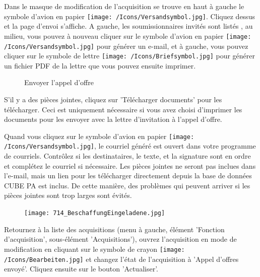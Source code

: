 Dans le masque de modification de l'acquisition se trouve en haut à gauche le symbole d'avion en papier \texttt{[image: /Icons/Versandsymbol.jpg]}. Cliquez dessus et la page d'envoi s'affiche. A gauche, les soumissionnaires invités sont listés , au milieu, vous pouvez à nouveau cliquer sur le symbole d'avion en papier \texttt{[image: /Icons/Versandsymbol.jpg]}  pour générer un e-mail, et à gauche, vous pouvez cliquer sur le symbole de lettre \texttt{[image: /Icons/Briefsymbol.jpg]}  pour générer un fichier PDF de la lettre que vous pouvez ensuite imprimer.

\begin{figure}[H]
\caption{Envoyer l'appel d'offre}
\end{figure}

S'il y a des pièces jointes, cliquez sur 'Télécharger documents'  pour les télécharger. Ceci est uniquement nécessaire si vous avez choisi d'imprimer les documents pour les envoyer avec la lettre d'invitation à l'appel d'offre.

\vspace{\baselineskip}

Quand vous cliquez sur le symbole d'avion en papier \texttt{[image: /Icons/Versandsymbol.jpg]}, le courriel généré est ouvert dans votre programme de courriels. Contrôlez si les destinataires, le texte, et la signature sont en ordre et complétez le courriel si nécessaire. Les pièces jointes ne seront pas inclues dans l'e-mail, mais un lien pour les télécharger directement depuis la base de données CUBE PA est inclus. De cette manière, des problèmes qui peuvent arriver si les pièces jointes sont trop larges sont évités.

\begin{figure}
\vspace{-15pt}
\texttt{[image: 714\_BeschaffungEingeladene.jpg]}
\end{figure}

Retournez à la liste des acquisitions (menu à gauche, élément 'Fonction d'acquisition', sous-élément 'Acquisitions'), ouvrez l'acquisition en mode de modification en cliquant sur le symbole de crayon \texttt{[image: /Icons/Bearbeiten.jpg]} et changez l'état de l'acquisition à 'Appel d'offres envoyé'. Cliquez ensuite sur le bouton 'Actualiser'.

\vspace{\baselineskip}

